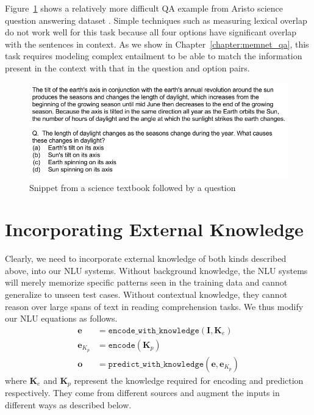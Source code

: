 Figure~\ref{fig:science_qa_example} shows a relatively more difficult QA example from Aristo science question answering dataset \citep{clark2015elementary}. Simple techniques such as measuring lexical overlap do not
work well for this task because all four options have significant overlap with the sentences in context. As we show in Chapter~\ref{chapter:memnet_qa}, this task requires modeling complex entailment to be able to match the information present in the context with that in the question and
option pairs.
\begin{figure}
\begin{center}
\includegraphics[width=6in]{figures/science_qa_example.png}
\caption{Snippet from a science textbook followed by a question}
\label{fig:science_qa_example}
\end{center}
\end{figure}


\section{Incorporating External Knowledge}
Clearly, we need to incorporate external knowledge of both kinds described above, into our NLU systems.
Without background knowledge, the NLU systems will merely memorize specific patterns seen in the training data
and cannot generalize to unseen test cases. Without contextual knowledge, they cannot reason over large spans of text in reading comprehension tasks.
We thus modify our NLU equations as follows.
\begin{align}
 \mathbf{e} &= \mathtt{encode\_with\_knowledge}(\mathbf{I}, \mathbf{K}_e) \label{eq:encoding_with_knowledge}\\
 \mathbf{e}_{K_p} &= \mathtt{encode}(\mathbf{K}_p) \\ \label{eq:knowledge_encoding}
 \mathbf{o} &= \mathtt{predict\_with\_knowledge}(\mathbf{e}, \mathbf{e}_{K_p}) \label{eq:prediction_with_knowledge}
\end{align}
where $\mathbf{K}_e$ and $\mathbf{K}_p$ represent the knowledge required for encoding and prediction respectively. 
They come from different sources and augment the inputs in different ways as described below.


